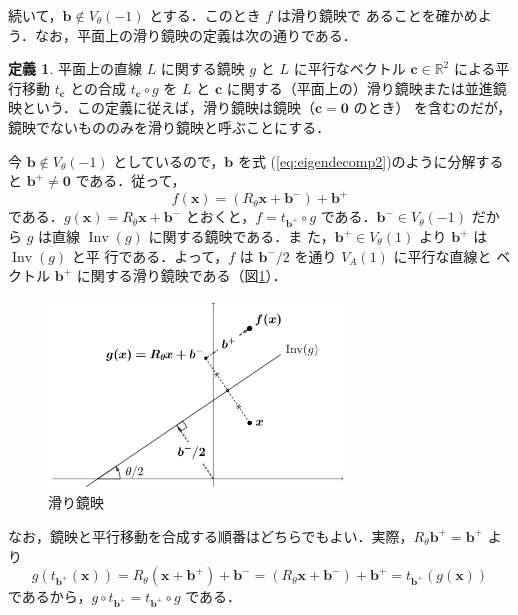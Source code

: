 \documentclass[11pt, uplatex, dvipdfmx, titlepage]{jsarticle}
\DeclareMathOperator{\Inv}{Inv}
\theoremstyle{definition}
\newtheorem*{definition}{定義}
\begin{document}
\newpage

続いて，$\bm{b} \notin V_{\theta}(-1)$ とする．このとき $f$ は滑り鏡映で
あることを確かめよう．なお，平面上の滑り鏡映の定義は次の通りである．

\begin{definition}
  平面上の直線 $L$ に関する鏡映 $g$ と $L$ に平行なベクトル $\bm{c}
  \in \mathbb{R}^2$ による平行移動 $t_{\bm{c}}$ との合成 $t_{\bm{c}}
  \circ g$ を $L$ と $\bm{c}$ に関する（平面上の）滑り鏡映または並進鏡
  映という．この定義に従えば，滑り鏡映は鏡映（$\bm{c}=\bm{0}$ のとき）
  を含むのだが，鏡映でないもののみを滑り鏡映と呼ぶことにする．
\end{definition}


今 $\bm{b} \notin V_{\theta}(-1)$ としているので，$\bm{b}$ を式 (\ref{eq:eigendecomp2})のように分解する
と $\bm{b}^{+} \neq \bm{0}$ である．従って，
\[
  f(\bm{x}) = \left(R_{\theta}\bm{x} + \bm{b}^{-}\right) + \bm{b}^{+}
\]
である．$g(\bm{x}) = R_{\theta}\bm{x}+\bm{b}^{-}$
とおくと，$f= t_{\bm{b}^{+}} \circ g$ である．$\bm{b}^{-} \in
V_{\theta}(-1)$ だから $g$ は直線 $\Inv(g)$ に関する鏡映である．ま
た，$\bm{b}^{+} \in V_{\theta}(1)$ より $\bm{b}^{+}$ は $\Inv(g)$ と平
行である．よって，$f$ は $\bm{b}^{-}/2$ を通り $V_A(1)$ に平行な直線と
ベクトル $\bm{b}^{+}$ に関する滑り鏡映である（図\ref{fig:glide2}）．
 \begin{figure}[h]
   \centering
   \includegraphics[height=5cm]{pictures/glide2.pdf}
   \caption{滑り鏡映}
   \label{fig:glide2}
 \end{figure}

 なお，鏡映と平行移動を合成する順番はどちらでもよい．実際，$R_{\theta}\bm{b}^{+}=\bm{b}^{+}$ より
\[
  g \left(t_{\bm{b}^{+}}(\bm{x})\right) = R_{\theta}\left(\bm{x} + \bm{b}^{+}\right) + \bm{b}^{-}
  = \left(R_{\theta}\bm{x} + \bm{b}^{-}\right) + \bm{b}^{+} = t_{\bm{b}^{+}}\left(g(\bm{x})\right)
\]
であるから，$g \circ t_{\bm{b}^{+}} = t_{\bm{b}^{+}} \circ g$ である．
\end{document}
